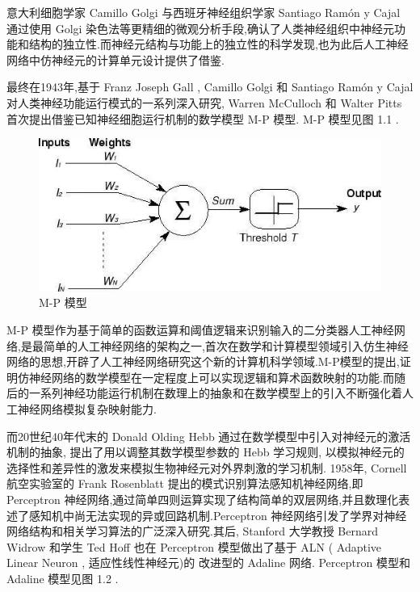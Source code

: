 意大利细胞学家 Camillo Golgi 与西班牙神经组织学家 Santiago Ramón y Cajal 通过使用 Golgi 染色法等更精细的微观分析手段,确认了人类神经组织中神经元功能和结构的独立性.而神经元结构与功能上的独立性的科学发现,也为此后人工神经网络中仿神经元的计算单元设计提供了借鉴.

最终在1943年,基于 Franz Joseph Gall , Camillo Golgi 和 Santiago Ramón y Cajal 对人类神经功能运行模式的一系列深入研究, Warren McCulloch 和 Walter Pitts 首次提出借鉴已知神经细胞运行机制的数学模型 M-P 模型. M-P 模型见图 1.1 .

\begin{figure}[H]
	\centering
	\includegraphics[scale=0.7]{Figures/mpmodel.png}
	\caption{M-P 模型}
\end{figure}

M-P 模型作为基于简单的函数运算和阈值逻辑来识别输入的二分类器人工神经网络,是最简单的人工神经网络的架构之一,首次在数学和计算模型领域引入仿生神经网络的思想,开辟了人工神经网络研究这个新的计算机科学领域.M-P模型的提出,证明仿神经网络的数学模型在一定程度上可以实现逻辑和算术函数映射的功能.而随后的一系列神经功能运行机制在数理上的抽象和在数学模型上的引入不断强化着人工神经网络模拟复杂映射能力.

而20世纪40年代末的 Donald Olding Hebb 通过在数学模型中引入对神经元的激活机制的抽象, 提出了用以调整其数学模型参数的 Hebb 学习规则, 以模拟神经元的选择性和差异性的激发来模拟生物神经元对外界刺激的学习机制. 1958年, Cornell 航空实验室的 Frank Rosenblatt 提出的模式识别算法感知机神经网络,即 Perceptron 神经网络,通过简单四则运算实现了结构简单的双层网络,并且数理化表述了感知机中尚无法实现的异或回路机制.Perceptron 神经网络引发了学界对神经网络结构和相关学习算法的广泛深入研究.其后, Stanford 大学教授 Bernard Widrow 和学生 Ted Hoff 也在 Perceptron 模型做出了基于 ALN ( Adaptive Linear Neuron , 适应性线性神经元)的 改进型的 Adaline 网络. Perceptron 模型和 Adaline 模型见图 1.2 .

